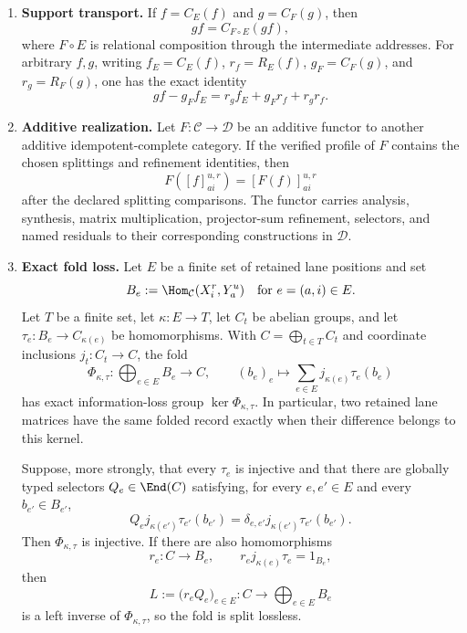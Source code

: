\begin{theorem}
\begin{enumerate}[label=\textup{(L\arabic*)}]
\item \textbf{Support transport.}  If \(f=C_E(f)\) and \(g=C_F(g)\), then
\[
 gf=C_{F\circ E}(gf),
\]
where \(F\circ E\) is relational composition through the intermediate
addresses.  For arbitrary \(f,g\), writing
\(f_E=C_E(f)\), \(r_f=R_E(f)\), \(g_F=C_F(g)\), and
\(r_g=R_F(g)\), one has the exact identity
\[
 gf-g_Ff_E
 =r_gf_E+g_Fr_f+r_gr_f.
\]

\item \textbf{Additive realization.}  Let
\(F:\mathcal C\to\mathcal D\) be an additive functor to another additive
idempotent-complete category.  If the verified profile of \(F\) contains the
chosen splittings and refinement identities, then
\[
 F([f]^{u,r}_{a i})
 =
 [F(f)]^{u,r}_{a i}
\]
after the declared splitting comparisons.  The functor carries analysis,
synthesis, matrix multiplication, projector-sum refinement, selectors, and
named residuals to their corresponding constructions in \(\mathcal D\).

\item \textbf{Exact fold loss.}  Let \(E\) be a finite set of retained lane
positions and set
\[
 B_e:=\Hom_{\mathcal C}(X_i^r,Y_a^u)
 \quad\text{for }e=(a,i)\in E.
\]
Let \(T\) be a finite set, let \(\kappa:E\to T\), let \(C_t\) be abelian
groups, and let \(\tau_e:B_e\to C_{\kappa(e)}\) be homomorphisms.  With
\(C=\bigoplus_{t\in T}C_t\) and coordinate inclusions
\(j_t:C_t\to C\), the fold
\[
 \Phi_{\kappa,\tau}:
 \bigoplus_{e\in E}B_e\longrightarrow C,
 \qquad
 (b_e)_e\longmapsto
 \sum_{e\in E}j_{\kappa(e)}\tau_e(b_e)
\]
has exact information-loss group \(\ker\Phi_{\kappa,\tau}\).  In particular,
two retained lane matrices have the same folded record exactly when their
difference belongs to this kernel.

Suppose, more strongly, that every \(\tau_e\) is injective and that there are
globally typed selectors \(Q_e\in\End(C)\) satisfying, for every
\(e,e'\in E\) and every \(b_{e'}\in B_{e'}\),
\[
 Q_ej_{\kappa(e')}\tau_{e'}(b_{e'})
 =
 \delta_{e,e'}j_{\kappa(e')}\tau_{e'}(b_{e'}).
\]
Then \(\Phi_{\kappa,\tau}\) is injective.  If there are also homomorphisms
\[
 r_e:C\longrightarrow B_e,
 \qquad
 r_ej_{\kappa(e)}\tau_e=1_{B_e},
\]
then
\[
 L:=\bigl(r_eQ_e\bigr)_{e\in E}:C\longrightarrow\bigoplus_{e\in E}B_e
\]
is a left inverse of \(\Phi_{\kappa,\tau}\), so the fold is split lossless.
\end{enumerate}
\end{theorem}

